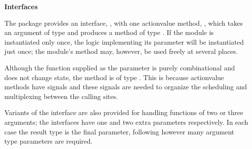 {\bf Interfaces}



The  package provides an interface, , with one
actionvalue method, , which takes an argument of type  and
produces  a
method of type .  If the module is instantiated only once,
the logic implementing its parameter will be instantiated just once; the
module's method may, however, be used freely at several places.

Although the function supplied as the parameter is purely combinational and does
not change state, the method is of type .  This is
because  actionvalue methods have  signals and these
signals are needed to organize the scheduling and multiplexing
between the calling sites.

Variants of the interface   are also provided for handling
 functions of two or three arguments; the interfaces have one and two
extra parameters respectively.  In each case the result type is the final
parameter, following however many argument type parameters are required.



